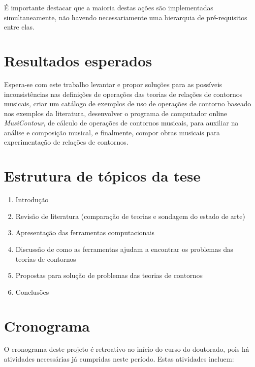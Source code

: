 \documentclass[12pt]{article}
\newcommand{\eng}[1]{\textit{#1}}
\begin{document}
É importante destacar que a maioria destas ações são implementadas
simultaneamente, não havendo necessariamente uma hierarquia de
pré-requisitos entre elas.

\section{Resultados esperados}
\label{sec:resultados-esperados}

Espera-se com este trabalho levantar e propor soluções para as
possíveis inconsistências nas definições de operações das teorias de
relações de contornos musicais, criar um catálogo de exemplos de uso
de operações de contorno baseado nos exemplos da literatura,
desenvolver o programa de computador online \eng{MusiContour}, de
cálculo de operações de contornos musicais, para auxiliar na análise e
composição musical, e finalmente, compor obras musicais para
experimentação de relações de contornos.

\section{Estrutura de tópicos da tese}
\label{sec:estrutura-de-topicos}

\begin{enumerate}
\item Introdução
\item Revisão de literatura (comparação de teorias e sondagem do
  estado de arte)
\item Apresentação das ferramentas computacionais
\item Discussão de como as ferramentas ajudam a encontrar os problemas
  das teorias de contornos
\item Propostas para solução de problemas das teorias de contornos
\item Conclusões
\end{enumerate}

\section{Cronograma}
\label{sec:cronograma}

O cronograma deste projeto é retroativo ao início do curso do
doutorado, pois há atividades necessárias já cumpridas neste
período. Estas atividades incluem:
\end{document}
